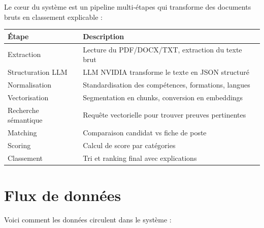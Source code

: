 \documentclass[12pt,a4paper,oneside]{book}
\begin{document}
Le cœur du système est un pipeline multi-étapes qui transforme des documents bruts en classement explicable :

\begin{center}
\begin{tabular}{|l|l|}
\toprule
\textbf{Étape} & \textbf{Description} \\
\midrule
Extraction & Lecture du PDF/DOCX/TXT, extraction du texte brut \\
Structuration LLM & LLM NVIDIA transforme le texte en JSON structuré \\
Normalisation & Standardisation des compétences, formations, langues \\
Vectorisation & Segmentation en chunks, conversion en embeddings \\
Recherche sémantique & Requête vectorielle pour trouver preuves pertinentes \\
Matching & Comparaison candidat vs fiche de poste \\
Scoring & Calcul de score par catégories \\
Classement & Tri et ranking final avec explications \\
\bottomrule
\end{tabular}
\end{center}

\section{Flux de données}

Voici comment les données circulent dans le système :
\end{document}
